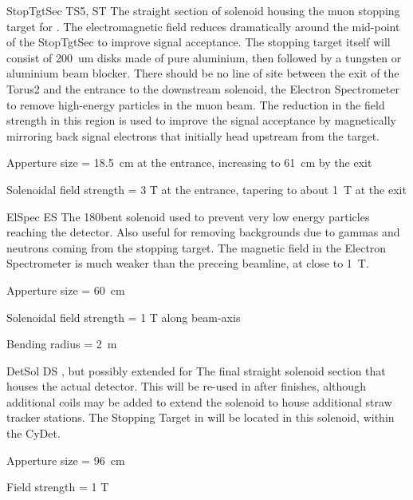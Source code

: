 {StopTgtSec}
{TS5, ST}
{\phaseII}
{The straight section of solenoid housing the muon stopping target for \phaseII.  The
electromagnetic field reduces dramatically around the mid-point of the
StopTgtSec to improve signal acceptance.  The stopping target itself will
consist of 200~um disks made of pure aluminium, then followed by a
tungsten or aluminium beam blocker.  There should be no line of site between
the exit of the Torus2 and the entrance to the downstream solenoid, the
Electron Spectrometer to remove high-energy particles in the muon beam.
The reduction in the field strength in this region is used to improve the
signal acceptance by magnetically mirroring back signal electrons that initially head
upstream from the target.
}
{\item Apperture size = 18.5~cm at the entrance, increasing to  61~cm by the exit
 \item Solenoidal field strength = 3 T at the entrance, tapering to about 1~T at the exit}

{ElSpec}
{ES}
{\phaseII}
{The 180\degree bent solenoid used to prevent very low energy particles reaching the detector.
  Also useful for removing backgrounds due to gammas and neutrons coming from the stopping target.
  The magnetic field in the Electron Spectrometer is much weaker than the preceing beamline, at close to 1~T.}
{\item Apperture size = 60~cm
 \item Solenoidal field strength = 1 T along beam-axis
 \item Bending radius = 2~m}

{DetSol}
{DS}
{\phaseI, but possibly extended for \phaseII}
{The final straight solenoid section that houses the actual detector.
  This will be re-used in \phaseII after \phaseI finishes, although additional coils may be added to extend the solenoid to house additional straw tracker stations.
The Stopping Target in \phaseI will be located in this solenoid, within the CyDet.
  }
{\item Apperture size = 96~cm
 \item Field strength = 1 T}

